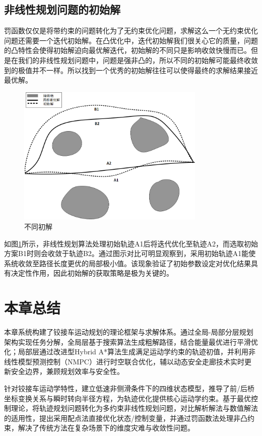 \documentclass[master,academic]{ysuthesis} %
\begin{document}
		\subsection{非线性规划问题的初始解}
		罚函数仅仅是将带约束的问题转化为了无约束优化问题，求解这么一个无约束优化问题还需要一个迭代初始解。在凸优化中，迭代初始解我们很关心它的质量，问题的凸特性会使得初始解迫向最优解迭代，初始解的不同只是影响收敛快慢而已。但是在我们的非线性规划问题中，问题是强非凸的，所以不同的初始解可能最终收敛到的极值并不一样。所以找到一个优秀的初始解往往可以使得最终的求解结果接近最优解。
		\begin{figure}[!ht]
			\centering
			\includegraphics[width=0.8\textwidth]{不同初解.png}
			\caption{不同初解}
			\label{fig:不同初解}
		\end{figure}
		如图\ref{fig:不同初解}所示，非线性规划算法处理初始轨迹A1后将迭代优化至轨迹A2，而选取初始方案B1时则会收敛于轨迹B2。通过图示对比可明显观察到，采用初始轨迹A1能使系统收敛至路径长度更优的局部极小值。该现象验证了初始参数设定对优化结果具有决定性作用，因此初始解的获取策略是极为关键的。

	\section{本章总结}
	本章系统构建了铰接车运动规划的理论框架与求解体系。通过全局-局部分层规划架构实现任务分解，全局层基于搜索算法生成粗解路径，结合能量最优进行平滑优化；局部层通过改进型Hybrid A*算法生成满足运动学约束的轨迹初值，并利用非线性模型预测控制（NMPC）进行时空联合优化，辅以动态安全走廊技术实时更新安全边界，兼顾规划效率与安全性。

	针对铰接车运动学特性，建立低速非侧滑条件下的四维状态模型，推导了前/后桥坐标变换关系与瞬时转向半径方程，为轨迹优化提供核心运动学约束。基于最优控制理论，将轨迹规划问题转化为多约束非线性规划问题，对比解析解法与数值解法的适用性，提出采用配点法直接优化状态/控制变量，并通过罚函数法处理非凸约束，解决了传统方法在复杂场景下的维度灾难与收敛性问题。
\end{document}
